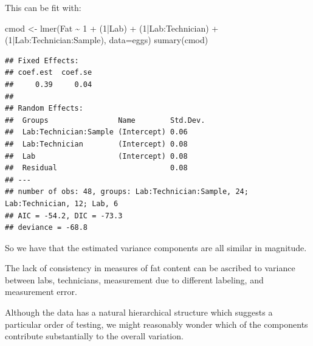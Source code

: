 \documentclass[
  ignorenonframetext,
]{beamer}
\newenvironment{Shaded}{\begin{snugshade}}{\end{snugshade}}
\newcommand{\AttributeTok}[1]{\textcolor[rgb]{0.77,0.63,0.00}{#1}}
\newcommand{\DecValTok}[1]{\textcolor[rgb]{0.00,0.00,0.81}{#1}}
\newcommand{\FunctionTok}[1]{\textcolor[rgb]{0.00,0.00,0.00}{#1}}
\newcommand{\NormalTok}[1]{#1}
\newcommand{\OtherTok}[1]{\textcolor[rgb]{0.56,0.35,0.01}{#1}}
\newcommand{\SpecialCharTok}[1]{\textcolor[rgb]{0.00,0.00,0.00}{#1}}
\begin{document}
\begin{frame}[fragile]{}
\protect\hypertarget{section-13}{}
This can be fit with:

\vspace{12pt}
\tiny

\begin{Shaded}
\begin{Highlighting}[]
\NormalTok{cmod }\OtherTok{\textless{}{-}} \FunctionTok{lmer}\NormalTok{(Fat }\SpecialCharTok{\textasciitilde{}} \DecValTok{1} \SpecialCharTok{+}\NormalTok{ (}\DecValTok{1}\SpecialCharTok{|}\NormalTok{Lab) }\SpecialCharTok{+}\NormalTok{ (}\DecValTok{1}\SpecialCharTok{|}\NormalTok{Lab}\SpecialCharTok{:}\NormalTok{Technician) }\SpecialCharTok{+}\NormalTok{  (}\DecValTok{1}\SpecialCharTok{|}\NormalTok{Lab}\SpecialCharTok{:}\NormalTok{Technician}\SpecialCharTok{:}\NormalTok{Sample), }
             \AttributeTok{data=}\NormalTok{eggs) }
\FunctionTok{sumary}\NormalTok{(cmod)}
\end{Highlighting}
\end{Shaded}

\begin{verbatim}
## Fixed Effects:
## coef.est  coef.se 
##     0.39     0.04 
## 
## Random Effects:
##  Groups                Name        Std.Dev.
##  Lab:Technician:Sample (Intercept) 0.06    
##  Lab:Technician        (Intercept) 0.08    
##  Lab                   (Intercept) 0.08    
##  Residual                          0.08    
## ---
## number of obs: 48, groups: Lab:Technician:Sample, 24; Lab:Technician, 12; Lab, 6
## AIC = -54.2, DIC = -73.3
## deviance = -68.8
\end{verbatim}
\end{frame}

\begin{frame}{}
\protect\hypertarget{section-14}{}
So we have that the estimated variance components are all similar in
magnitude.

The lack of consistency in measures of fat content can be ascribed to
variance between labs, technicians, measurement due to different
labeling, and measurement error.

Although the data has a natural hierarchical structure which suggests a
particular order of testing, we might reasonably wonder which of the
components contribute substantially to the overall variation.
\end{frame}
\end{document}

